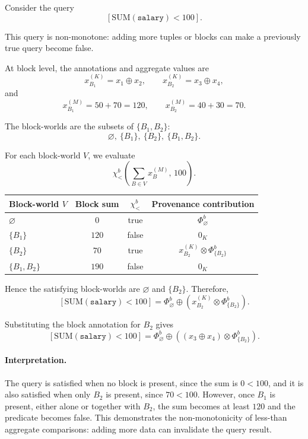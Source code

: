 \documentclass[10pt,a4paper]{scrartcl}
\theoremstyle{definition}
\theoremstyle{remark}
\begin{document}
Consider the query
\[
[\mathrm{SUM}(\texttt{salary}) < 100].
\]

This query is non-monotone: adding more tuples or blocks 
can make a previously true query become false.

At block level, the annotations and aggregate values are
\[
x^{(K)}_{B_1}=x_1 \oplus x_2,\qquad 
x^{(K)}_{B_2}=x_3 \oplus x_4,
\]
and
\[
x^{(M)}_{B_1}=50+70=120,\qquad 
x^{(M)}_{B_2}=40+30=70.
\]

The block-worlds are the subsets of $\{B_1,B_2\}$:
\[
\varnothing,\ \{B_1\},\ \{B_2\},\ \{B_1,B_2\}.
\]

For each block-world $V$, we evaluate
\[
\chi^b_{<}\!\left(\sum_{B\in V} x_B^{(M)},\,100\right).
\]

\begin{center}
\begin{tabular}{>{\raggedright\arraybackslash}p{3cm}ccc}
\toprule
Block-world $V$ & Block sum & $\chi^b_{<}$ & Provenance contribution \\
\midrule
$\varnothing$ & $0$   & true  & $\Phi^b_{\varnothing}$ \\
$\{B_1\}$     & $120$ & false & $0_K$ \\
$\{B_2\}$     & $70$  & true  & $x^{(K)}_{B_2}\otimes \Phi^b_{\{B_2\}}$ \\
$\{B_1,B_2\}$ & $190$ & false & $0_K$ \\
\bottomrule
\end{tabular}
\end{center}

Hence the satisfying block-worlds are $\varnothing$ and $\{B_2\}$. Therefore,
\[
[\mathrm{SUM}(\texttt{salary}) < 100]
=
\Phi^b_{\varnothing}
\oplus
\left(x^{(K)}_{B_2}\otimes \Phi^b_{\{B_2\}}\right).
\]

Substituting the block annotation for $B_2$ gives
\[
[\mathrm{SUM}(\texttt{salary}) < 100]
=
\Phi^b_{\varnothing}
\oplus
\left((x_3\oplus x_4)\otimes \Phi^b_{\{B_2\}}\right).
\]

\paragraph{Interpretation.}
The query is satisfied when no block is present, since 
the sum is $0<100$, and it is also satisfied when only 
$B_2$ is present, since $70<100$. However, once $B_1$ 
is present, either alone or together with $B_2$, the 
sum becomes at least $120$ and the predicate becomes false. 
This demonstrates the non-monotonicity of less-than aggregate 
comparisons: adding more data can invalidate the query result.
\end{document}
